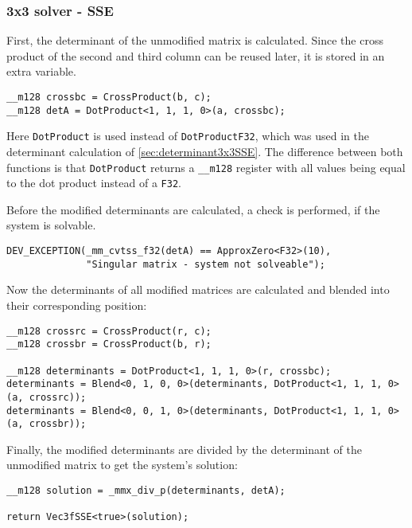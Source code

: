 \subsubsection{3x3 solver - SSE}
\label{sec:cramerSolver3x3SSE}

First, the determinant of the unmodified matrix is calculated. Since the cross product of the second and third column can be reused later, it is stored in an extra variable.

\begin{verbatim}
__m128 crossbc = CrossProduct(b, c);
__m128 detA = DotProduct<1, 1, 1, 0>(a, crossbc);
\end{verbatim}

Here \texttt{DotProduct} is used instead of \texttt{DotProductF32}, which was used in the determinant calculation of \cref{sec:determinant3x3SSE}. 
The difference between both functions is that \texttt{DotProduct} returns a \texttt{__m128} register with all values being equal to the dot product instead of a \texttt{F32}.

Before the modified determinants are calculated, a check is performed, if the system is solvable.

\begin{verbatim}
DEV_EXCEPTION(_mm_cvtss_f32(detA) == ApproxZero<F32>(10), 
              "Singular matrix - system not solveable");
\end{verbatim}

Now the determinants of all modified matrices are calculated and blended into their corresponding position:

\begin{verbatim}
__m128 crossrc = CrossProduct(r, c);
__m128 crossbr = CrossProduct(b, r);

__m128 determinants = DotProduct<1, 1, 1, 0>(r, crossbc);
determinants = Blend<0, 1, 0, 0>(determinants, DotProduct<1, 1, 1, 0>(a, crossrc));
determinants = Blend<0, 0, 1, 0>(determinants, DotProduct<1, 1, 1, 0>(a, crossbr));
\end{verbatim}

Finally, the modified determinants are divided by the determinant of the unmodified matrix to get the system's solution:

\begin{verbatim}
__m128 solution = _mmx_div_p(determinants, detA);

return Vec3fSSE<true>(solution);
\end{verbatim}


